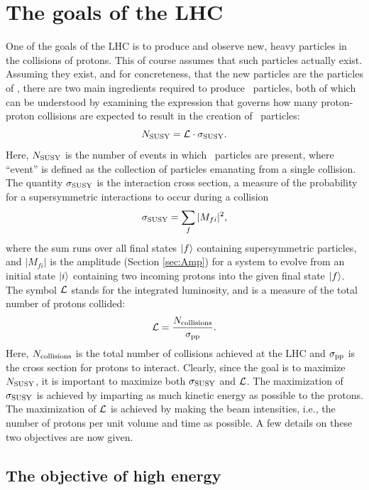 \section{The goals of the LHC}
One of the goals of the LHC is to produce and observe new, heavy particles in the collisions of protons. This of course assumes that such particles actually exist. Assuming they exist, and for concreteness, that the new particles are the particles of \SUSY, there are two main ingredients required to produce \susy~particles, both of which can be understood by examining the expression that governs how many proton-proton collisions are expected to result in the creation of \susy~particles:
\begin{equation}
N_{\rm SUSY} = \mathcal{L}\cdot \sigma_{\rm SUSY}.
\end{equation}
Here, $N_{\rm SUSY}$ is the number of events in which \susy~particles are present, where ``event'' is defined as the collection of particles emanating from a single collision. The quantity $\sigma_{\rm SUSY}$ is the interaction cross section, a measure of the probability for a supersymmetric interactions to occur during a collision
\begin{equation}
\sigma_{\rm SUSY} = \sum_{f}|M_{fi}|^2,
\end{equation}
where the sum runs over all final states $\ket{f}$ containing supersymmetric particles, and $|M_{fi}|$ is the amplitude (Section \ref{sec:Amp}) for a system to evolve from an initial state $\ket{i}$ containing two incoming protons into the given final state $\ket{f}$. The symbol $\mathcal{L}$ stands for the integrated luminosity, and is a measure of the total number of protons collided:
\begin{equation}
\mathcal{L} = \frac{N_{\rm collisions}}{\sigma_{\rm pp}}.
\end{equation} 
Here, $N_{\rm collisions}$ is the total number of collisions achieved at the LHC and $\sigma_{\rm pp}$ is the cross section for protons to interact. Clearly, since the goal is to maximize $N_{\rm SUSY}$, it is important to maximize both $\sigma_{\rm SUSY}$ and $\mathcal{L}$. The maximization of $\sigma_{\rm SUSY}$ is achieved by imparting as much kinetic energy as possible to the protons.  The maximization of $\mathcal{L}$ is achieved by making the beam intensities, i.e., the number of protons per unit volume and time as possible. A few details on these two objectives are now given.

\subsection{The objective of high energy}

